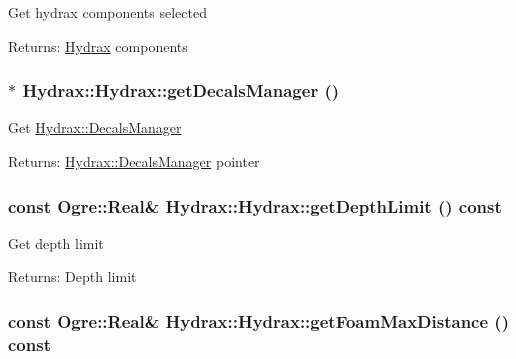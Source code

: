 Get hydrax components selected \begin{Desc}
\item[Returns:]\hyperlink{class_hydrax_1_1_hydrax}{Hydrax} components \end{Desc}
\hypertarget{class_hydrax_1_1_hydrax_0ed95597b4ad5e33f2ba7f82f3ac4083}{
\subsubsection[{getDecalsManager}]{$\ast$ Hydrax::Hydrax::getDecalsManager ()}}
\label{class_hydrax_1_1_hydrax_0ed95597b4ad5e33f2ba7f82f3ac4083}


Get \hyperlink{class_hydrax_1_1_decals_manager}{Hydrax::DecalsManager} \begin{Desc}
\item[Returns:]\hyperlink{class_hydrax_1_1_decals_manager}{Hydrax::DecalsManager} pointer \end{Desc}
\hypertarget{class_hydrax_1_1_hydrax_03b8b82e6223f7e3ec47d845957ec5e3}{
\subsubsection[{getDepthLimit}]{\setlength{\rightskip}{0pt plus 5cm}const Ogre::Real\& Hydrax::Hydrax::getDepthLimit () const}}
\label{class_hydrax_1_1_hydrax_03b8b82e6223f7e3ec47d845957ec5e3}


Get depth limit \begin{Desc}
\item[Returns:]Depth limit \end{Desc}
\hypertarget{class_hydrax_1_1_hydrax_942025a1a9f93e24221b618b4130732a}{
\subsubsection[{getFoamMaxDistance}]{\setlength{\rightskip}{0pt plus 5cm}const Ogre::Real\& Hydrax::Hydrax::getFoamMaxDistance () const}}
\label{class_hydrax_1_1_hydrax_942025a1a9f93e24221b618b4130732a}


